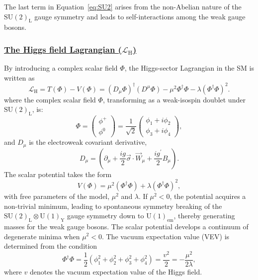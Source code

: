 The last term in Equation~\eqref{eq:SU2} arises from the non-Abelian nature of the 
$\mathrm{SU}(2)_{\text{L}}$ gauge symmetry and leads to self-interactions among 
the weak gauge bosons.

\subsubsection{\underline{The Higgs field Lagrangian ($\mathcal{L}_{\text{H}} $)} }\label{sec:higgs}

By introducing a complex scalar field $\Phi$, the Higgs-sector Lagrangian in the SM is written as
\begin{equation}
\mathcal{L}_{\text{H}}=T(\Phi)-V(\Phi)=\left(D_{\mu} \Phi\right)^{\dagger}\left(D^{\mu} \Phi\right)-\mu^{2} \Phi^{\dagger} \Phi-\lambda\left(\Phi^{\dagger} \Phi\right)^{2}.
\end{equation}
where the complex scalar field $\Phi$, transforming as a 
weak-isospin doublet under $\mathrm{SU}(2)_{\text{L}}$, is:
\begin{equation}
\Phi =
\begin{pmatrix}
\phi^{+} \\
\phi^{0}
\end{pmatrix}
=
\frac{1}{\sqrt{2}}
\begin{pmatrix}
\phi_1 + i \phi_2 \\
\phi_3 + i \phi_4
\end{pmatrix},
\end{equation}
and  $D_\mu$ is the electroweak covariant derivative,
\begin{equation}
    D_{\mu}=\left(\partial_{\mu}+\frac{i g}{2} \vec{\sigma} \cdot \vec{W}_{\mu}+\frac{i g^{\prime}}{2} B_{\mu}\right). 
\end{equation}
The scalar potential takes the form
\begin{equation}
\label{eq:Lag_potential}
V(\Phi)
=
\mu^{2} (\Phi^{\dagger}\Phi)
+
\lambda (\Phi^{\dagger}\Phi)^{2},
\end{equation}
with free parameters of the model, $\mu^2$ and $\lambda$. 
If $\mu^2 < 0$, the potential acquires a non-trivial minimum, leading to 
spontaneous symmetry breaking of the 
$\mathrm{SU}(2)_{\text{L}} \otimes \mathrm{U}(1)_{\text{Y}}$ gauge symmetry down to 
$\mathrm{U}(1)_{\mathrm{em}}$, thereby generating masses for the weak gauge bosons.
The scalar potential develops a continuum of degenerate minima when 
$\mu^2 < 0$. The vacuum expectation value (VEV) is determined from the condition
\begin{equation}
\label{eq:Higgs-min}
\Phi^\dagger \Phi
=
\frac{1}{2}
\left(
\phi_1^2 + \phi_2^2 + \phi_3^2 + \phi_4^2
\right)
=
\frac{v^2}{2}
=
-\frac{\mu^2}{2\lambda},
\end{equation}
where $v$ denotes the vacuum expectation value of the Higgs field.

